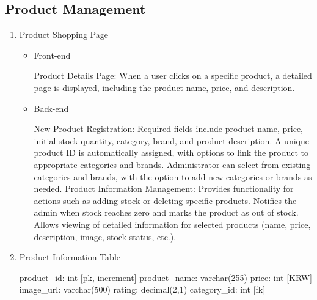 \documentclass[conference]{IEEEtran}
\begin{document}
\subsection{Product Management}

\begin{enumerate}
\setlength{\parindent}{2ex}
\item Product Shopping Page

\begin{itemize}
\setlength{\parindent}{2ex}
\item Front-end

Product Details Page: When a user clicks on a specific product, a detailed page is displayed, including the product name, price, and description.

\item Back-end

New Product Registration: Required fields include product name, price, initial stock quantity, category, brand, and product description. A unique product ID is automatically assigned, with options to link the product to appropriate categories and brands. Administrator can select from existing categories and brands, with the option to add new categories or brands as needed. \newline\hspace*{1.2ex}
Product Information Management: Provides functionality for actions such as adding stock or deleting specific products. Notifies the admin when stock reaches zero and marks the product as out of stock. Allows viewing of detailed information for selected products (name, price, description, image, stock status, etc.).
\end{itemize}

\item Product Information Table

product\_id: int [pk, increment] \newline\hspace*{1.2ex}
product\_name: varchar(255) \newline\hspace*{1.2ex}
price: int [KRW] \newline\hspace*{1.2ex}
image\_url: varchar(500) \newline\hspace*{1.2ex}
rating: decimal(2,1) \newline\hspace*{1.2ex}
category\_id: int [fk] 

\hspace{0.5em}{\scriptsize Table attribute can be changed in development.}
\end{enumerate}
\end{document}
